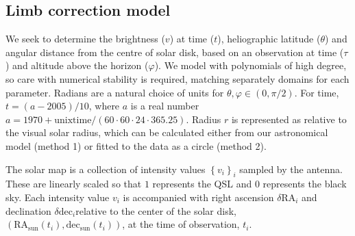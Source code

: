 \documentclass{aa}
\begin{document}
\subsection{Limb correction model}\label{sect:limb}

We seek to determine the brightness ($v$) at time ($t$), heliographic latitude
($\theta$) and angular distance from the centre of solar disk, based on an
observation at time ($\tau$) and altitude above the horizon ($\varphi$).
We model with polynomials of high degree, so care with numerical stability is 
required, matching separately domains for each parameter.
Radians are a natural choice of units for $\theta, \varphi \in \left( 0, \pi/2 
\right)$. For time, $t = (a - 2005)/10$, where $a$ is a real number $a = 1970 +
\mathrm{unixtime}/(60\cdot60\cdot24\cdot365.25)$. Radius $r$ is represented as
relative to the visual solar radius, which can be calculated either from our
astronomical model (method 1) or fitted to the data as a circle (method 2).

The solar map is a collection of intensity values $\left\{ v_i \right\}_i$ 
sampled by the antenna.
These are linearly scaled so that $1$ represents the QSL and $0$ represents
the black sky.
Each intensity value $v_i$ is accompanied with right ascension $\delta \mathrm{RA}_i$ and declination $\delta 
\mathrm{dec}_i$relative to the center of the solar disk, $\left( \mathrm{RA}_{\mathrm{sun}}(t_i), 
\mathrm{dec}_{\mathrm{sun}}(t_i) \right)$, at the time of observation, $t_i$.
\end{document}
